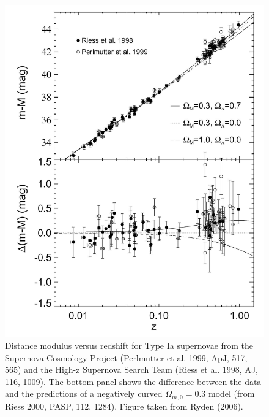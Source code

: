 \documentclass[a4paper,11pt]{article}
\begin{document}
\begin{figure}[h!]
    \includegraphics[width=15cm]{figures/DistanceModulus.png}
    \centering
    \caption{Distance modulus versus redshift for Type Ia supernovae from the Supernova Cosmology Project (Perlmutter et al. 1999, ApJ, 517, 565) and the High-z Supernova Search Team (Riess et al. 1998, AJ, 116, 1009). The bottom panel shows the difference between the data and the predictions of a negatively curved $\Omega_{m,0}=0.3$ model (from Riess 2000, PASP, 112, 1284). Figure taken from Ryden (2006).}
    \label{fig:distancemodulus}
\end{figure}
\end{document}
